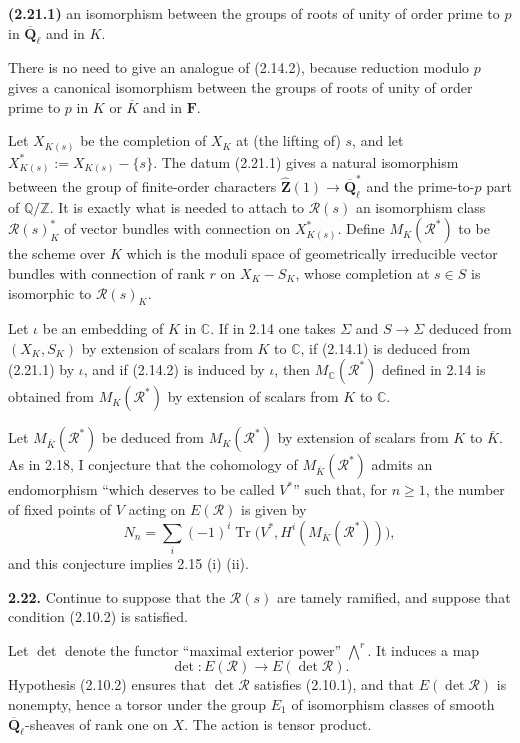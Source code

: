 \documentclass[11pt]{article}
\newcommand{\F}{\mathbf{F}}
\newcommand{\Qbl}{\overline{\mathbf{Q}}_{\ell}}
\newcommand{\Tr}{\operatorname{Tr}}
\newcommand{\Q}{\mathbb{Q}}
\newcommand{\Z}{\mathbb{Z}}
\newcommand{\Zhat}{\widehat{\mathbf{Z}}}
\newcommand{\C}{\mathbb{C}}
\newcommand{\Rcal}{\mathcal{R}}
\newcommand{\para}[1]{\medskip\noindent\textbf{#1}\enspace}
\begin{document}
\para{(2.21.1)} an isomorphism between the groups of roots of unity of order prime to \(p\) in \(\Qbl\) and in \(K\).

There is no need to give an analogue of (2.14.2), because reduction modulo \(p\) gives a canonical isomorphism between the groups of roots of unity of order prime to \(p\) in \(K\) or \(\overline K\) and in \(\F\).

Let \(X_{K(s)}\) be the completion of \(X_K\) at (the lifting of) \(s\), and let \(X_{K(s)}^*:=X_{K(s)}-\{s\}\). The datum (2.21.1) gives a natural isomorphism between the group of finite-order characters \(\Zhat(1)\to\Qbl^*\) and the prime-to-\(p\) part of \(\Q/\Z\). It is exactly what is needed to attach to \(\Rcal(s)\) an isomorphism class \(\Rcal(s)^*_K\) of vector bundles with connection on \(X_{K(s)}^*\). Define \(M_K(\Rcal^*)\) to be the scheme over \(K\) which is the moduli space of geometrically irreducible vector bundles with connection of rank \(r\) on \(X_K-S_K\), whose completion at \(s\in S\) is isomorphic to \(\Rcal(s)_K\).

Let \(\iota\) be an embedding of \(K\) in \(\C\). If in 2.14 one takes \(\Sigma\) and \(S\to\Sigma\) deduced from \((X_K,S_K)\) by extension of scalars from \(K\) to \(\C\), if (2.14.1) is deduced from (2.21.1) by \(\iota\), and if (2.14.2) is induced by \(\iota\), then \(M_\C(\Rcal^*)\) defined in 2.14 is obtained from \(M_K(\Rcal^*)\) by extension of scalars from \(K\) to \(\C\).

Let \(M_{\overline K}(\Rcal^*)\) be deduced from \(M_K(\Rcal^*)\) by extension of scalars from \(K\) to \(\overline K\). As in 2.18, I conjecture that the cohomology of \(M_{\overline K}(\Rcal^*)\) admits an endomorphism ``which deserves to be called \(V^*\)'' such that, for \(n\geq 1\), the number of fixed points of \(V\) acting on \(E(\Rcal)\) is given by
\begin{equation}
N_n=\sum_i(-1)^i\Tr\bigl(V^*,H^i(M_{\overline K}(\Rcal^*))\bigr),
\tag{2.21.2}
\end{equation}
and this conjecture implies 2.15 (i) (ii).

\para{2.22.} Continue to suppose that the \(\Rcal(s)\) are tamely ramified, and suppose that condition (2.10.2) is satisfied.

Let \(\det\) denote the functor ``maximal exterior power'' \(\bigwedge^r\). It induces a map
\begin{equation}
\det:E(\Rcal)\to E(\det\Rcal).
\tag{2.22.1}
\end{equation}
Hypothesis (2.10.2) ensures that \(\det\Rcal\) satisfies (2.10.1), and that \(E(\det\Rcal)\) is nonempty, hence a torsor under the group \(E_1\) of isomorphism classes of smooth \(\Qbl\)-sheaves of rank one on \(X\). The action is tensor product.
\end{document}
